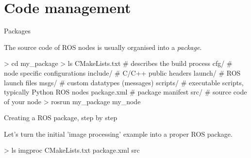 \documentclass[compress]{beamer}
\begin{document}
\section[Code]{Code management}

\begin{frame}[fragile]{Packages}

The source code of ROS nodes is usually organised into a \emph{package}.

\begin{shcode}
> cd my_package
> ls
CMakeLists.txt  # describes the build process
cfg/  # node specific configurations
include/  # C/C++ public headers
launch/  # ROS launch files
msgs/  # custom datatypes (messages)
scripts/  # executable scripts, typically Python ROS nodes
package.xml  # package manifest
src/  # source code of your node
> rosrun my_package my_node
\end{shcode}



\end{frame}

\begin{frame}[fragile]{Creating a ROS package, step by step}

Let's turn the initial 'image processing' example into a proper ROS package.

\pause
\begin{shcode}
> ls imgproc
CMakeLists.txt  package.xml  src
\end{shcode}

\end{frame}
\end{document}
